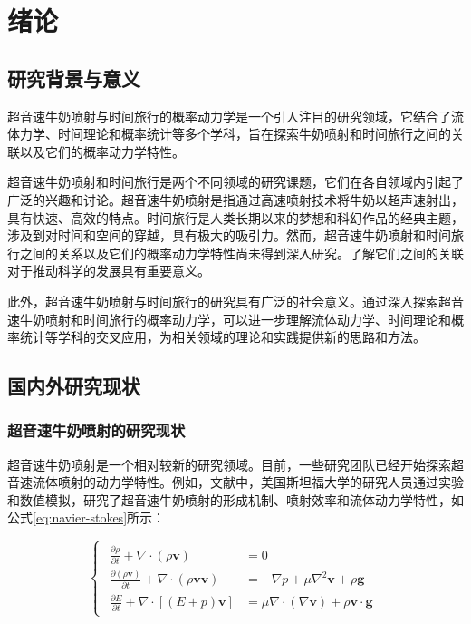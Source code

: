\chapter{绪论}

\section{研究背景与意义}

超音速牛奶喷射与时间旅行的概率动力学是一个引人注目的研究领域，它结合了流体力学、时间理论和概率统计等多个学科，旨在探索牛奶喷射和时间旅行之间的关联以及它们的概率动力学特性。

超音速牛奶喷射和时间旅行是两个不同领域的研究课题，它们在各自领域内引起了广泛的兴趣和讨论。超音速牛奶喷射是指通过高速喷射技术将牛奶以超声速射出，具有快速、高效的特点。时间旅行是人类长期以来的梦想和科幻作品的经典主题，涉及到对时间和空间的穿越，具有极大的吸引力。然而，超音速牛奶喷射和时间旅行之间的关系以及它们的概率动力学特性尚未得到深入研究。了解它们之间的关联对于推动科学的发展具有重要意义。

此外，超音速牛奶喷射与时间旅行的研究具有广泛的社会意义。通过深入探索超音速牛奶喷射和时间旅行的概率动力学，可以进一步理解流体动力学、时间理论和概率统计等学科的交叉应用，为相关领域的理论和实践提供新的思路和方法。

\section{国内外研究现状}

\subsection{超音速牛奶喷射的研究现状}

超音速牛奶喷射是一个相对较新的研究领域。目前，一些研究团队已经开始探索超音速流体喷射的动力学特性。例如，文献\cite{johnson2024}中，美国斯坦福大学的研究人员通过实验和数值模拟，研究了超音速牛奶喷射的形成机制、喷射效率和流体动力学特性，如公式\ref{eq:navier-stokes}所示：

\begin{equation}
  \begin{cases}
    \begin{aligned}
      \frac{\partial \rho}{\partial t} + \nabla \cdot (\rho \mathbf{v}) & = 0 \\
      \frac{\partial (\rho \mathbf{v})}{\partial t} + \nabla \cdot (\rho \mathbf{v} \mathbf{v}) & = -\nabla p + \mu \nabla^2 \mathbf{v} + \rho \mathbf{g} \\
      \frac{\partial E}{\partial t} + \nabla \cdot \left[(E + p) \mathbf{v}\right] & = \mu \nabla \cdot \left(\nabla \mathbf{v}\right) + \rho \mathbf{v} \cdot \mathbf{g}
    \end{aligned}
  \end{cases}
  \label{eq:navier-stokes}
\end{equation}

